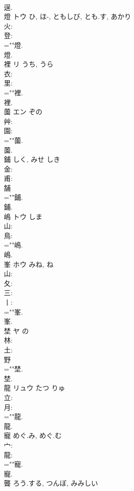 \documentclass[8pt]{extreport}
\begin{document}
\begin{CJK}{UTF8}{min}
\\	逞.
\\	燈	トウ	ひ, ほ-, ともしび, とも.す, あかり		
\\	火: 
\\	登: 
\\	=""燈.
\\	燈.
\\	裡	リ	うち, うら		
\\	衣: 
\\	里: 
\\	=""裡.
\\	裡.
\\	薗	エン		ぞの	
\\	艸: 
\\	園: 
\\	=""薗.
\\	薗.
\\	鋪		しく, みせ	しき			
\\	金: 
\\	甫: 
\\	舗 
\\	=""鋪.
\\	鋪.
\\	嶋	トウ	しま		
\\	山: 
\\	鳥: 
\\	=""嶋.
\\	嶋.
\\	峯	ホウ	みね, ね		
\\	山: 
\\	夂: 
\\	三: 
\\	丨: 
\\	=""峯.
\\	峯.
\\	埜	ヤ	の				
\\	林: 
\\	土: 
\\	野 
\\	=""埜.
\\	埜.
\\	龍	リュウ	たつ	りゅ	
\\	立: 
\\	月: 
\\	=""龍.
\\	龍.
\\	寵		めぐ.み, めぐ.む				
\\	宀: 
\\	龍: 
\\	=""寵.
\\	寵.
\\	聾		ろう.する, つんぼ, みみしい				

\end{CJK}
\end{document}
